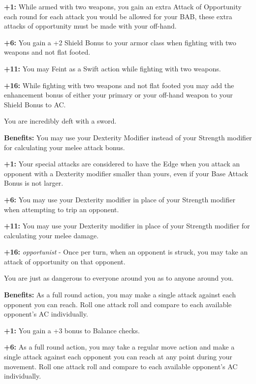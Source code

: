 \textbf{+1:} While armed with two weapons, you gain an extra Attack of Opportunity each round for each attack you would be allowed for your BAB, these extra attacks of opportunity must be made with your off-hand.

\textbf{+6:} You gain a +2 Shield Bonus to your armor class when fighting with two weapons and not flat footed.

\textbf{+11:} You may Feint as a Swift action while fighting with two weapons.

\textbf{+16:} While fighting with two weapons and not flat footed you may add the enhancement bonus of either your primary or your off-hand weapon to your Shield Bonus to AC.


You are incredibly deft with a sword.

\textbf{Benefits:} You may use your Dexterity Modifier instead of your Strength modifier for calculating your melee attack bonus.

\textbf{+1:} Your special attacks are considered to have the Edge when you attack an opponent with a Dexterity modifier smaller than yours, even if your Base Attack Bonus is not larger.

\textbf{+6:} You may use your Dexterity modifier in place of your Strength modifier when attempting to trip an opponent.

\textbf{+11:} You may use your Dexterity modifier in place of your Strength modifier for calculating your melee damage.

\textbf{+16:} \textit{opportunist} - Once per turn, when an opponent is struck, you may take an attack of opportunity on that opponent.


You are just as dangerous to everyone around you as to anyone around you.

\textbf{Benefits:} As a full round action, you may make a single attack against each opponent you can reach. Roll one attack roll and compare to each available opponent's AC individually.

\textbf{+1:} You gain a +3 bonus to Balance checks.

\textbf{+6:} As a full round action, you may take a regular move action and make a single attack against each opponent you can reach at any point during your movement. Roll one attack roll and compare to each available opponent's AC individually.

